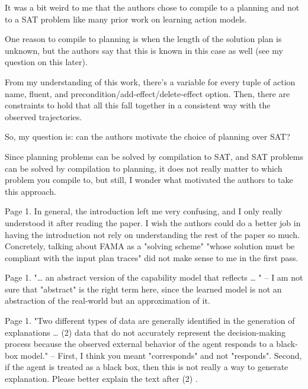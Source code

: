 \documentclass{article}
\begin{document}
\begin{mdframed}[hidealllines=true,backgroundcolor=gray!20]
  It was a bit weird to me that the authors chose to compile to a planning and not to a SAT problem like many prior work on learning action models.

One reason to compile to planning is when the length of the solution plan is unknown, but the authors say that this is known in this case as well (see my question on this later).

From my understanding of this work, there's a variable for every tuple of action name, fluent, and precondition/add-effect/delete-effect option. Then, there are constraints to hold that all this fall together in a consistent way with the observed trajectories.

So, my question is: can the authors motivate the choice of planning over SAT?

Since planning problems can be solved by compilation to SAT, and SAT problems can be solved by compilation to planning, it does not really matter to which problem you compile to, but still, I wonder what motivated the authors to take this approach.
\end{mdframed}

\begin{mdframed}[hidealllines=true,backgroundcolor=gray!20]
  Page 1. In general, the introduction left me very confusing, and I only really understood it after reading the paper. I wish the authors could do a better job in having the introduction not rely on understanding the rest of the paper so much. Concretely, talking about FAMA as a "solving scheme" "whose solution must be compliant with the input plan traces" did not make sense to me in the first pass.
\end{mdframed}

\begin{mdframed}[hidealllines=true,backgroundcolor=gray!20]
    Page 1. "… an abstract version of the capability model that reflects … " – I am not sure that "abstract" is the right term here, since the learned model is not an abstraction of the real-world but an approximation of it.
\end{mdframed}

\begin{mdframed}[hidealllines=true,backgroundcolor=gray!20]
    Page 1.  "Two different types of data are generally identified in the generation of explanations … (2) data that do not accurately represent the decision-making process because the observed external behavior of the agent responds to a black-box model." – First, I think you meant "corresponds" and not "responds". Second, if the agent is treated as a black box, then this is not really a way to generate explanation. Please better explain the text after (2) . 
\end{mdframed}
\end{document}
